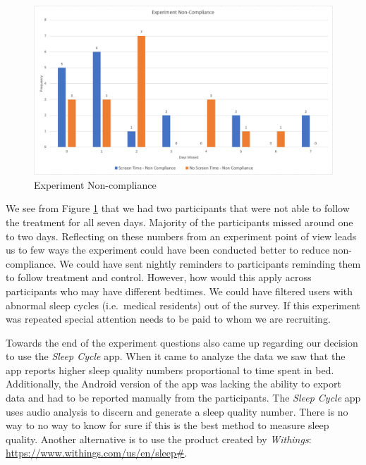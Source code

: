 \documentclass[12pt,]{article}
\begin{document}
\begin{figure}[H]

{\centering \includegraphics[width=1\linewidth]{img/compliance} 

}

\caption{Experiment Non-compliance}\label{fig:noncompliance}
\end{figure}

We see from Figure \ref{fig:noncompliance} that we had two participants
that were not able to follow the treatment for all seven days. Majority
of the participants missed around one to two days. Reflecting on these
numbers from an experiment point of view leads us to few ways the
experiment could have been conducted better to reduce non-compliance. We
could have sent nightly reminders to participants reminding them to
follow treatment and control. However, how would this apply across
participants who may have different bedtimes. We could have filtered
users with abnormal sleep cycles (i.e.~medical residents) out of the
survey. If this experiment was repeated special attention needs to be
paid to whom we are recruiting.

Towards the end of the experiment questions also came up regarding our
decision to use the \emph{Sleep Cycle} app. When it came to analyze the
data we saw that the app reports higher sleep quality numbers
proportional to time spent in bed. Additionally, the Android version of
the app was lacking the ability to export data and had to be reported
manually from the participants. The \emph{Sleep Cycle} app uses audio
analysis to discern and generate a sleep quality number. There is no way
to no way to know for sure if this is the best method to measure sleep
quality. Another alternative is to use the product created by
\emph{Withings}: \url{https://www.withings.com/us/en/sleep\#}.
\end{document}
